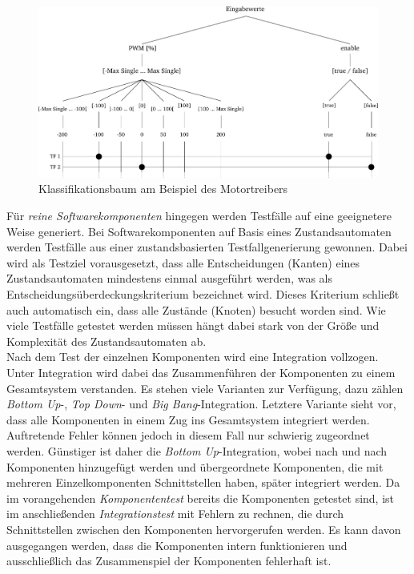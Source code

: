 \begin{figure}[H]%
\includegraphics[width=\columnwidth]{./Bilder/fig_klass}%
\caption{Klassifikationsbaum am Beispiel des Motortreibers}%
\label{fig_klass}%
\end{figure}\noindent
Für \textit{reine Softwarekomponenten} hingegen werden Testfälle auf eine geeignetere Weise generiert. Bei Softwarekomponenten auf Basis eines Zustandsautomaten werden Testfälle aus einer zustandsbasierten Testfallgenerierung gewonnen. Dabei wird als Testziel vorausgesetzt, dass alle Entscheidungen (Kanten) eines Zustandsautomaten mindestens einmal ausgeführt werden, was als Entscheidungsüberdeckungskriterium bezeichnet wird. Dieses Kriterium schließt auch automatisch ein, dass alle Zustände (Knoten) besucht worden sind. Wie viele Testfälle getestet werden müssen hängt dabei stark von der Größe und Komplexität des Zustandsautomaten ab.\\
Nach dem Test der einzelnen Komponenten wird eine Integration vollzogen. Unter Integration wird dabei das Zusammenführen der Komponenten zu einem Gesamtsystem verstanden. Es stehen viele Varianten zur Verfügung, dazu zählen \textit{Bottom Up}-, \textit{Top Down}- und \textit{Big Bang}-Integration. Letztere Variante sieht vor, dass alle Komponenten in einem Zug ins Gesamtsystem integriert werden. Auftretende Fehler können jedoch in diesem Fall nur schwierig zugeordnet werden. Günstiger ist daher die \textit{Bottom Up}-Integration, wobei nach und nach Komponenten hinzugefügt werden und übergeordnete Komponenten, die mit mehreren Einzelkomponenten Schnittstellen haben, später integriert werden. Da im vorangehenden \textit{Komponententest} bereits die Komponenten getestet sind, ist im anschließenden \textit{Integrationstest} mit Fehlern zu rechnen, die durch Schnittstellen zwischen den Komponenten hervorgerufen werden. Es kann davon ausgegangen werden, dass die Komponenten intern funktionieren und ausschließlich das Zusammenspiel der Komponenten fehlerhaft ist. \\
